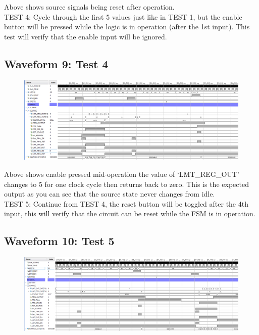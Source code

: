 \documentclass[11pt]{report}
\begin{document}
Above shows source signals being reset after operation.\\

TEST 4: Cycle through the first 5 values just like in TEST 1, but the enable button will be pressed while the logic is in
operation (after the 1st input). This test will verify that the enable input will be ignored.

\subsection*{Waveform 9: Test 4 }
\begin{figure}[H]
       \includegraphics[width=\columnwidth]{Assets/Test4.png}
\end{figure}

Above shows enable pressed mid-operation the value of `LMT\_REG\_OUT' changes to 5 for one clock cycle then returns back to zero. 
This is the expected output as you can see that the source state never changes from idle.\\ 

TEST 5: Continue from TEST 4, the reset button will be toggled after the 4th input, this will verify that the circuit can be reset
while the FSM is in operation.

\subsection*{Waveform 10: Test 5 }
\begin{figure}[H]
       \includegraphics[width=\columnwidth]{Assets/Test5.png}
\end{figure}
\end{document}
